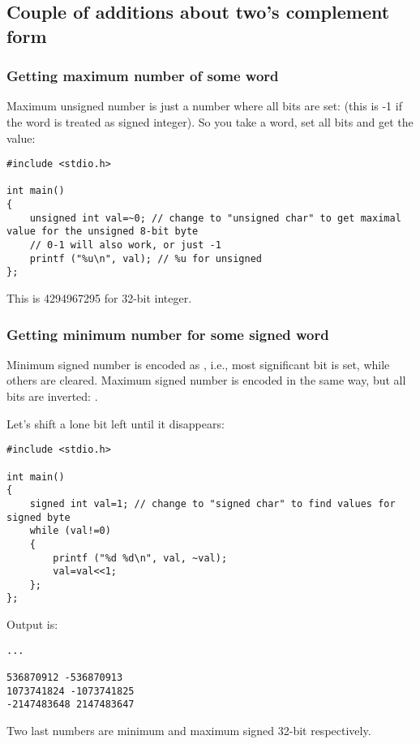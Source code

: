 \subsection{Couple of additions about two's complement form}

\subsubsection{Getting maximum number of some \gls{word}}

Maximum unsigned number is just a number where all bits are set: 
(this is -1 if the \gls{word} is treated as signed integer).
So you take a \gls{word}, set all bits and get the value:

\begin{lstlisting}[style=customc]
#include <stdio.h>

int main()
{
	unsigned int val=~0; // change to "unsigned char" to get maximal value for the unsigned 8-bit byte
	// 0-1 will also work, or just -1
	printf ("%u\n", val); // %u for unsigned
};
\end{lstlisting}

This is 4294967295 for 32-bit integer.

\subsubsection{Getting minimum number for some signed \gls{word}}

Minimum signed number is encoded as , i.e., most significant bit is set, while others are cleared.
Maximum signed number is encoded in the same way, but all bits are inverted: .

Let's shift a lone bit left until it disappears:

\begin{lstlisting}[style=customc]
#include <stdio.h>

int main()
{
	signed int val=1; // change to "signed char" to find values for signed byte
	while (val!=0)
	{
		printf ("%d %d\n", val, ~val);
		val=val<<1;
	};
};
\end{lstlisting}

Output is:

\begin{lstlisting}
...

536870912 -536870913
1073741824 -1073741825
-2147483648 2147483647
\end{lstlisting}

Two last numbers are minimum and maximum signed 32-bit  respectively.

